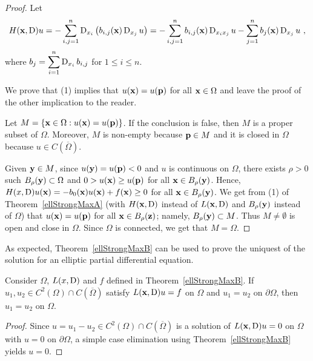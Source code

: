 \begin{proof}
Let
\begin{equation} \label{strongMaxEq3}
H(\mathbf{x},\operatorname{D})u = - \sum_{i,j=1}^n
\operatorname{D}_{x_i} \left( b_{i,j}(\mathbf{x}) \operatorname{D}_{x_j} u \right)
= - \sum_{i,j=1}^n b_{i,j}(\mathbf{x}) \operatorname{D}_{x_i x_j} u
- \sum_{j=1}^n b_j(\mathbf{x}) \operatorname{D}_{x_j} u \ ,
\end{equation}
where $\displaystyle b_j = \sum_{i=1}^n \operatorname{D}_{x_i} b_{i,j}$ for
$1 \leq i \leq n$.

We prove that (1) implies that $u(\mathbf{x})= u(\mathbf{p})$ for all
$\mathbf{x} \in \Omega$ and leave the proof of the other implication to
the reader.

Let $M = \left\{ \mathbf{x} \in \Omega : u(\mathbf{x}) = u(\mathbf{p}) \right\}$.
If the conclusion is false, then $M$ is a proper subset of $\Omega$.
Moreover, $M$ is non-empty because $\mathbf{p} \in M$ and it is
closed in $\Omega$ because $u \in C(\overline{\Omega})$.

Given $\mathbf{y} \in M$, since $u(\mathbf{y}) = u(\mathbf{p}) <0$ and $u$ is
continuous on $\Omega$, there exists
$\rho>0$ such $B_{\rho}(\mathbf{y}) \subset \Omega$ and
$0 > u(\mathbf{x}) \geq u(\mathbf{p})$ for all $\mathbf{x} \in B_{\rho}(\mathbf{y})$.
Hence,
$H(x,\operatorname{D}) u(\mathbf{x}) = -b_0(\mathbf{x}) u(\mathbf{x}) + f(\mathbf{x}) \geq 0$ 
for all $\mathbf{x} \in B_{\rho}(\mathbf{y})$.  We get from (1) of
Theorem~\ref{ellStrongMaxA} (with $H(\mathbf{x},\operatorname{D})$ instead of
$L(\mathbf{x},\operatorname{D})$ and $B_{\rho}(\mathbf{y})$ instead of $\Omega$) that
$u(\mathbf{x}) = u(\mathbf{p})$ for all $\mathbf{x} \in B_{\rho}(\mathbf{z})$;
namely, $B_{\rho}(\mathbf{y}) \subset M$.  Thus $M \neq \emptyset$ is
open and close in $\Omega$.  Since $\Omega$ is connected, we get that
$M = \Omega$.
\end{proof}

As expected, Theorem~\ref{ellStrongMaxB} can be used to prove the
uniquest of the solution for an elliptic partial differential equation.

\begin{cor}
Consider $\Omega$, $L(x,\operatorname{D})$ and $f$ defined in
Theorem~\ref{ellStrongMaxB}.  If
$\displaystyle u_1 , u_2 \in C^2(\Omega) \cap C(\overline{\Omega})$
satisfy $L(\mathbf{x},\operatorname{D}) u = f$ on $\Omega$ and $u_1 = u_2$ on
$\partial \Omega$, then $u_1 = u_2$ on $\Omega$.
\end{cor}

\begin{proof}
Since $\displaystyle u = u_1-u_2 \in C^2(\Omega) \cap C(\overline{\Omega})$
is a solution of $L(\mathbf{x},\operatorname{D}) u = 0$ on $\Omega$ with $u=0$ on
$\partial \Omega$, a simple case elimination using
Theorem~\ref{ellStrongMaxB} yields $u = 0$.
\end{proof}

